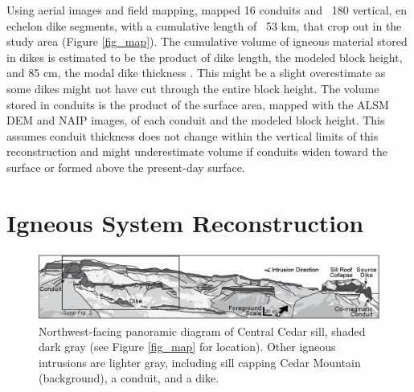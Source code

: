 \documentclass[12pt,letter]{article}
\begin{document}
Using aerial images and field mapping, \citet{kiyosugi2012relationship} mapped 16 conduits and ~180 vertical, en echelon dike segments, with a cumulative length of ~53 km, that crop out in the study area (Figure \ref{fig_map}). The cumulative volume of igneous material stored in dikes is estimated to be the product of dike length, the modeled block height, and 85 cm, the modal dike thickness \citep{delaney1997physical}. This might be a slight overestimate as some dikes might not have cut through the entire block height. The volume stored in conduits is the product of the surface area, mapped with the ALSM DEM and NAIP images, of each conduit and the modeled block height. This assumes conduit thickness does not change within the vertical limits of this reconstruction and might underestimate volume if conduits widen toward the surface or formed above the present-day surface.

\section{Igneous System Reconstruction}

\begin{figure}
\centering
\includegraphics[width=\linewidth]{figures/Fig2-panorama}
\caption{Northwest-facing panoramic diagram of Central Cedar sill, shaded dark gray (see Figure \ref{fig_map} for location). Other igneous intrusions are lighter gray, including sill capping Cedar Mountain (background), a conduit, and a dike.}
\label{fig_panorama}
\end{figure}
\end{document}
